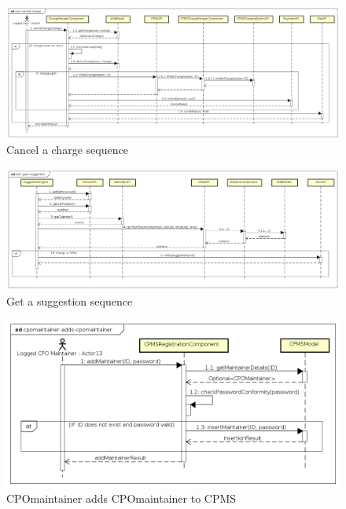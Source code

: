 \begin{figure}[!h]
    \begin{center}
        \includegraphics[keepaspectratio, width=16cm]{Sequence/user-cancels-charge.png}
        \caption{Cancel a charge sequence}
        \label{fig:user-cancels-charge}
    \end{center}
\end{figure}
\begin{figure}[!h]
    \begin{center}
        \includegraphics[keepaspectratio, width=16cm]{Sequence/user-gets-suggestion.png}
        \caption{Get a suggestion sequence}
        \label{fig:user-gets-suggestion}
    \end{center}
\end{figure}
\begin{figure}[!h]
    \begin{center}
        \includegraphics[keepaspectratio, width=16cm]{Sequence/cpomaintainer-adds-cpomaintainer.png}
        \caption{\ac{CPO}maintainer adds \ac{CPO}maintainer to \ac{CPMS}}
        \label{fig:cpomaintainer-adds-cpomaintainer}
    \end{center}
\end{figure}
